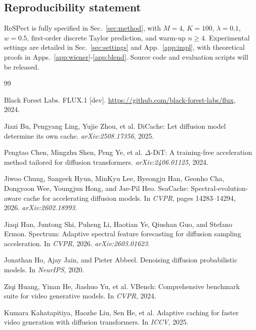 \documentclass{article} %
\begin{document}
\subsection*{Reproducibility statement}
ReSPect is fully specified in Sec.~\ref{sec:method}, with
$M{=}4$, $K{=}100$, $\lambda{=}0.1$, $w{=}0.5$, first-order
discrete Taylor prediction, and warm-up $n\ge4$. Experimental settings
are detailed in Sec.~\ref{sec:settings} and
App.~\ref{app:impl}, with theoretical proofs in
Apps.~\ref{app:wiener}-\ref{app:blend}. Source code and evaluation
scripts will be released.

\begin{thebibliography}{99}

Black Forest Labs.
\newblock FLUX.1 [dev].
\newblock \url{https://github.com/black-forest-labs/flux}, 2024.

Jiazi Bu, Pengyang Ling, Yujie Zhou, et al.
\newblock DiCache: Let diffusion model determine its own cache.
\newblock \emph{arXiv:2508.17356}, 2025.

Pengtao Chen, Mingzhu Shen, Peng Ye, et al.
\newblock $\Delta$-DiT: A training-free acceleration method tailored for
  diffusion transformers.
\newblock \emph{arXiv:2406.01125}, 2024.

Jiwoo Chung, Sangeek Hyun, MinKyu Lee, Byeongju Han, Geonho Cha, Dongyoon Wee,
  Youngjun Hong, and Jae-Pil Heo.
\newblock SeaCache: Spectral-evolution-aware cache for accelerating
  diffusion models.
\newblock In \emph{CVPR}, pages 14283--14294, 2026.
\newblock \emph{arXiv:2602.18993}.

Jiaqi Han, Juntong Shi, Puheng Li, Haotian Ye, Qiushan Guo, and Stefano Ermon.
\newblock Spectrum: Adaptive spectral feature forecasting for diffusion
  sampling acceleration.
\newblock In \emph{CVPR}, 2026.
\newblock \emph{arXiv:2603.01623}.

Jonathan Ho, Ajay Jain, and Pieter Abbeel.
\newblock Denoising diffusion probabilistic models.
\newblock In \emph{NeurIPS}, 2020.

Ziqi Huang, Yinan He, Jiashuo Yu, et al.
\newblock VBench: Comprehensive benchmark suite for video generative
  models.
\newblock In \emph{CVPR}, 2024.

Kumara Kahatapitiya, Haozhe Liu, Sen He, et al.
\newblock Adaptive caching for faster video generation with diffusion
  transformers.
\newblock In \emph{ICCV}, 2025.


\end{thebibliography}
\end{document}

